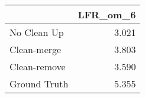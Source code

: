\begin{tabular}{lr}
\toprule
{} & LFR_om_6 \\
\midrule
No Clean Up  &    3.021 \\
Clean-merge  &    3.803 \\
Clean-remove &    3.590 \\
Ground Truth &    5.355 \\
\bottomrule
\end{tabular}
